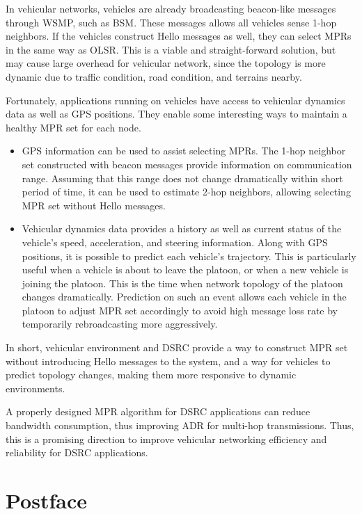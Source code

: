 \documentclass[12pt]{report}
\begin{document}
In vehicular networks, vehicles are already broadcasting beacon-like messages through WSMP, such as BSM. These messages allows all vehicles sense 1-hop neighbors. If the vehicles construct Hello messages as well, they can select MPRs in the same way as OLSR. This is a viable and straight-forward solution, but may cause large overhead for vehicular network, since the topology is more dynamic due to traffic condition, road condition, and terrains nearby.

Fortunately, applications running on vehicles have access to vehicular dynamics data as well as GPS positions. They enable some interesting ways to maintain a healthy MPR set for each node.

\begin{itemize}
  \item GPS information can be used to assist selecting MPRs. The 1-hop neighbor set constructed with beacon messages provide information on communication range. Assuming that this range does not change dramatically within short period of time, it can be used to estimate 2-hop neighbors, allowing selecting MPR set without Hello messages.
  \item Vehicular dynamics data provides a history as well as current status of the vehicle's speed, acceleration, and steering information. Along with GPS positions, it is possible to predict each vehicle's trajectory. This is particularly useful when a vehicle is about to leave the platoon, or when a new vehicle is joining the platoon. This is the time when network topology of the platoon changes dramatically. Prediction on such an event allows each vehicle in the platoon to adjust MPR set accordingly to avoid high message loss rate by temporarily rebroadcasting more aggressively.
\end{itemize}

In short, vehicular environment and DSRC provide a way to construct MPR set without introducing Hello messages to the system, and a way for vehicles to predict topology changes, making them more responsive to dynamic environments.

A properly designed MPR algorithm for DSRC applications can reduce bandwidth consumption, thus improving ADR for multi-hop transmissions. Thus, this is a promising direction to improve vehicular networking efficiency and reliability for DSRC applications.





\chapter*{Postface}
%
\end{document}
